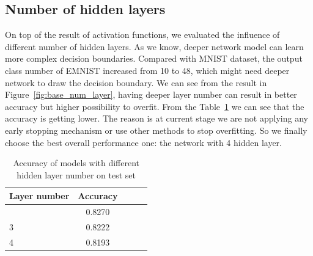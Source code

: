 \documentclass{article}
\begin{document}
\subsection{Number of hidden layers}
 On top of the result of activation functions, we evaluated the influence of different number of hidden layers. As we know, deeper network model can learn more complex decision boundaries. Compared with MNIST dataset, the output class number of EMNIST increased from 10 to 48, which might need deeper network to draw the decision boundary. We can see from the result in Figure~\ref{fig:base_num_layer}, having deeper layer number can result in better accuracy but higher possibility to overfit. From the Table~\ref{tab:layer_num} we can see that the accuracy is getting lower. The reason is at current stage we are not applying any early stopping mechanism or use other methods to stop overfitting. So we finally choose the best overall performance one: the network with 4 hidden layer.
 

\begin{table}[tb]
\vskip 3mm
\begin{center}
\begin{small}
\begin{sc}
\begin{tabular}{lcccr}
\hline
\abovespace\belowspace
Layer number & Accuracy \\
\hline
\abovespace
2    	& 0.8270 	\\
3	 	& 0.8222 	\\
4	  	& 0.8193 	\\

\hline
\end{tabular}
\end{sc}
\end{small}
\caption{Accuracy of models with different hidden layer number on test set}
\label{tab:layer_num}
\end{center}
\vskip -3mm
\end{table}
\end{document}
